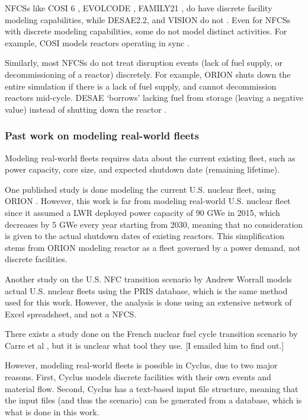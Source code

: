 \glspl{NFCS} like COSI 6 \cite{meyer_new_2009}, EVOLCODE \cite{alvarez-velarde_validation_2014},
FAMILY21 \cite{oecd_nuclear_2009},
do have discrete facility modeling capabilities, while
DESAE2.2\cite{tsibulskiy_desae_2006}, and VISION \cite{jacobson_verifiable_2010} do
not \cite{boucher_international_2010}. Even for \glspl{NFCS} with discrete modeling
capabilities, some do not model distinct activities. For example, COSI models
reactors operating in sync \cite{boucher_benchmark_2012}.

Similarly, most \glspl{NFCS} do not treat disruption events (lack of fuel supply,
or decommissioning of a reactor)
discretely. For example, ORION shuts down the entire simulation if there
is a lack of fuel supply, and cannot decommission reactors mid-cycle.
DESAE `borrows' lacking fuel from storage (leaving a
negative value) instead of shutting down the reactor \cite{mccarthy_benchmark_2012}.

\subsubsection{Past work on modeling real-world fleets}
Modeling real-world fleets requires data about the current existing fleet,
such as power capacity, core size, and expected shutdown date (remaining lifetime).

One published study is done modeling the current U.S. nuclear fleet,
using ORION \cite{sunny_transition_2015}. However, this work is far from
modeling real-world U.S. nuclear fleet since it assumed a \gls{LWR} deployed power capacity
of 90 GWe in 2015, which decreases by 5 GWe every year starting from 2030,
meaning that no consideration is given to the actual shutdown dates of
existing reactors. This simplification stems from ORION modeling reactor as
a fleet governed by a power demand, not discrete facilities.

Another study on the U.S. \gls{NFC} transition scenario by Andrew Worrall \cite{utilization_worrall_2013}
models actual U.S. nuclear fleets using the \gls{PRIS} database, which is the same
method used for this work. However, the analysis is done using an extensive
network of Excel spreadsheet, and not a \gls{NFCS}.

There exists a study done on the French nuclear fuel cycle transition scenario
by Carre et al \cite{carre_overview_2009}, but it is unclear what tool they use.
[I emailed him to find out.]

However, modeling real-world fleets is possible in Cyclus, due to two major
reasons. First, Cyclus models
discrete facilities with their own events and material flow.
Second, Cyclus has a text-based input file structure, meaning that
the input files (and thus the scenario) can be generated from 
a database, which is what is done in this work.

